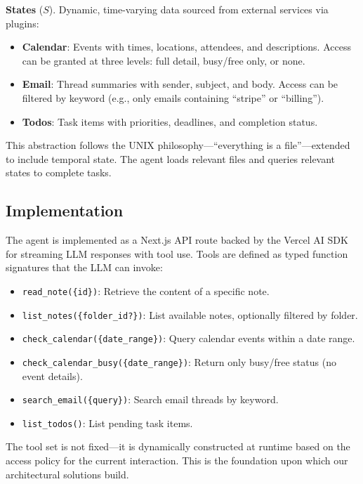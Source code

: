 \textbf{States} ($S$). Dynamic, time-varying data sourced from external services via plugins:
\begin{itemize}
    \item \textbf{Calendar}: Events with times, locations, attendees, and descriptions. Access can be granted at three levels: full detail, busy/free only, or none.
    \item \textbf{Email}: Thread summaries with sender, subject, and body. Access can be filtered by keyword (e.g., only emails containing ``stripe'' or ``billing'').
    \item \textbf{Todos}: Task items with priorities, deadlines, and completion status.
\end{itemize}

This abstraction follows the UNIX philosophy---``everything is a file''---extended to include temporal state. The agent loads relevant files and queries relevant states to complete tasks.

\subsection{Implementation}

The agent is implemented as a Next.js API route backed by the Vercel AI SDK for streaming LLM responses with tool use. Tools are defined as typed function signatures that the LLM can invoke:

\begin{itemize}
    \item \texttt{read\_note(\{id\})}: Retrieve the content of a specific note.
    \item \texttt{list\_notes(\{folder\_id?\})}: List available notes, optionally filtered by folder.
    \item \texttt{check\_calendar(\{date\_range\})}: Query calendar events within a date range.
    \item \texttt{check\_calendar\_busy(\{date\_range\})}: Return only busy/free status (no event details).
    \item \texttt{search\_email(\{query\})}: Search email threads by keyword.
    \item \texttt{list\_todos()}: List pending task items.
\end{itemize}

The tool set is not fixed---it is dynamically constructed at runtime based on the access policy for the current interaction. This is the foundation upon which our architectural solutions build.

